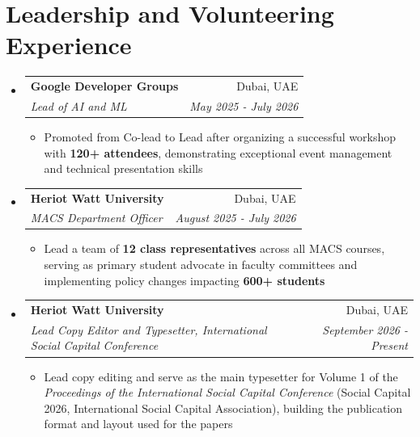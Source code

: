 \documentclass[a4paper,20pt]{article}
\makeatletter
\newcommand{\resumeItemWithoutTitle}[1] {
	\item\small{
		{#1 \vspace{-2pt}}
	}
}
\newcommand{\resumeSubheading}[4] {
	\vspace{-1pt}\item
	\begin{tabular*}{0.97\textwidth}{l@{\extracolsep{\fill}}r}
		\textbf{#1} & #2 \\
		\textit{#3} & \textit{#4} \\
	\end{tabular*}\vspace{-5pt}
}
\newcommand{\resumeSubHeadingListStart}{\begin{itemize}[leftmargin=*]}
\newcommand{\resumeSubHeadingListEnd}{\end{itemize}}
\newcommand{\resumeItemListStart}{\begin{itemize}}
\newcommand{\resumeItemListEnd}{\end{itemize}\vspace{-5pt}}
\makeatother
\begin{document}
\begin{description}[font=$\bullet$]

\end{description}
\vspace{2pt}

\section{Leadership and Volunteering Experience}
\resumeSubHeadingListStart
        \resumeSubheading{{Google Developer Groups}}{Dubai, UAE}{Lead of AI and ML}{May 2025 - July 2026}
        \resumeItemListStart
			\resumeItemWithoutTitle{Promoted from Co-lead to Lead after organizing a successful workshop with \textbf{120+ attendees}, demonstrating exceptional event management and technical presentation skills}
		\resumeItemListEnd
	\resumeSubHeadingListEnd

	\resumeSubHeadingListStart
        \resumeSubheading{{Heriot Watt University}}{Dubai, UAE}{MACS Department Officer}{August 2025 - July 2026}
        \resumeItemListStart
		  \resumeItemWithoutTitle{Lead a team of \textbf{12 class representatives} across all MACS courses, serving as primary student advocate in faculty committees and implementing policy changes impacting \textbf{600+ students}}
		\resumeItemListEnd
	\resumeSubHeadingListEnd

    \resumeSubHeadingListStart
        \resumeSubheading{{Heriot Watt University}}{Dubai, UAE}{Lead Copy Editor and Typesetter, \textit{International Social Capital Conference}}{September 2026 - Present}
        \resumeItemListStart
		  \resumeItemWithoutTitle{Lead copy editing and serve as the main typesetter for Volume 1 of the \textit{Proceedings of the International Social Capital Conference} (Social Capital 2026, International Social Capital Association), building the publication format and layout used for the papers}
		\resumeItemListEnd
	\resumeSubHeadingListEnd

    \vspace*{\fill}
\end{document}
